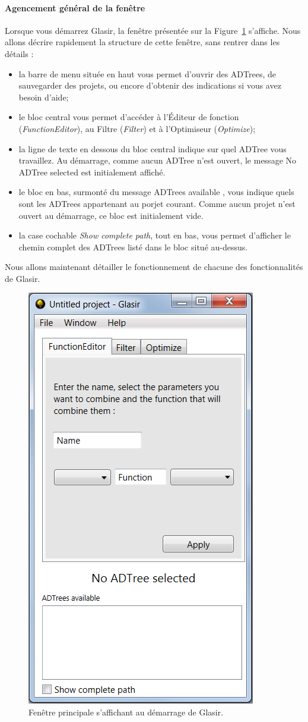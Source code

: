 \paragraph{Agencement général de la fenêtre}
Lorsque vous démarrez Glasir, la fenêtre présentée sur la {\sc Figure}~\ref{fig:princ} s'affiche. Nous allons décrire rapidement la structure de cette fenêtre, sans rentrer dans les détails : 
\begin{itemize}
	\item  la barre de menu située en haut vous permet d'ouvrir des ADTrees, de sauvegarder des projets, ou encore d'obtenir des indications si vous avez besoin d'aide;
	\item le bloc central vous permet d'accéder à l'Éditeur de fonction (\emph{FunctionEditor}), au Filtre (\emph{Filter}) et à l'Optimiseur (\emph{Optimize});
	\item la ligne de texte en dessous du bloc central indique sur quel ADTree vous travaillez. Au démarrage, comme aucun ADTree n'est ouvert, le message \og No ADTree selected \fg{} est initialement affiché.
	\item le bloc en bas, surmonté du message \og ADTrees available \fg{}, vous indique quels sont les ADTrees appartenant au porjet courant. Comme aucun projet n'est ouvert au démarrage, ce bloc est initialement vide.
	\item la case cochable \emph{Show complete path}, tout en bas, vous permet d'afficher le chemin complet des ADTrees listé dans le bloc situé au-dessus.
	\end{itemize}
	
	Nous allons maintenant détailler le fonctionnement de chacune des fonctionnalités de Glasir.
	
	\begin{figure}[!h]
        \centering
        \includegraphics[height=0.7\textwidth]{figure/glasirFenetrePrincipale.png}
        \caption{Fenêtre principale s'affichant au démarrage de Glasir.}
        \label{fig:princ}
    \end{figure}

